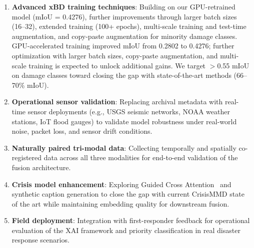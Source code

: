 \documentclass[journal]{IEEEtran}
\begin{document}
\begin{enumerate}
    \item \textbf{Advanced xBD training techniques}: Building on our GPU-retrained model (mIoU = 0.4276), further improvements through larger batch sizes (16--32), extended training (100+ epochs), multi-scale training and test-time augmentation, and copy-paste augmentation for minority damage classes. GPU-accelerated training improved mIoU from 0.2802 to 0.4276; further optimization with larger batch sizes, copy-paste augmentation, and multi-scale training is expected to unlock additional gains. We target $>$0.55 mIoU on damage classes toward closing the gap with state-of-the-art methods (66--70\% mIoU).
    \item \textbf{Operational sensor validation}: Replacing archival metadata with real-time sensor deployments (e.g., USGS seismic networks, NOAA weather stations, IoT flood gauges) to validate model robustness under real-world noise, packet loss, and sensor drift conditions.
    \item \textbf{Naturally paired tri-modal data}: Collecting temporally and spatially co-registered data across all three modalities for end-to-end validation of the fusion architecture.
    \item \textbf{Crisis model enhancement}: Exploring Guided Cross Attention~\cite{mouzannar2025guidedcross} and synthetic caption generation to close the gap with current CrisisMMD state of the art while maintaining embedding quality for downstream fusion.
    \item \textbf{Field deployment}: Integration with first-responder feedback for operational evaluation of the XAI framework and priority classification in real disaster response scenarios.
\end{enumerate}
\end{document}
